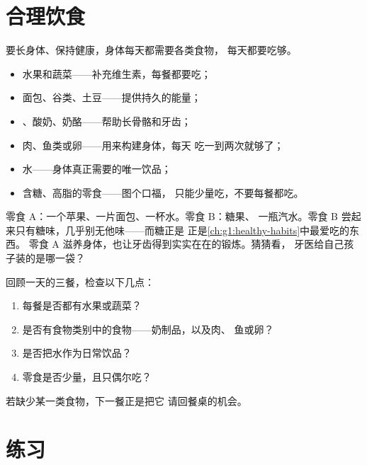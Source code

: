 \section{合理饮食}

\begin{proposition}[均衡的餐盘]\label{prop:g2:teeth-and-eating-well:balanced}
要长身体、保持健康，身体每天都需要各类食物，
每天都要吃够。
\begin{itemize}
  \item 水果和蔬菜——补充维生素，每餐都要吃；
  \item 面包、谷类、土豆——提供持久的能量；
  \item {}、酸奶、奶酪——帮助长骨骼和牙齿；
  \item 肉、鱼类或卵——用来构建身体，每天
        吃一到两次就够了；
  \item 水——身体真正需要的唯一饮品；
  \item 含糖、高脂的零食——图个口福，
        只能少量吃，不要每餐都吃。
\end{itemize}
\end{proposition}
\admitted

\begin{example}[两袋零食]\label{ex:g2:teeth-and-eating-well:snack}
零食 A：一个苹果、一片面包、一杯水。零食 B：糖果、
一瓶汽水。零食 B 尝起来只有糖味，几乎别无他味——而糖正是
正是\cref{ch:g1:healthy-habits}中最爱吃的东西。
零食 A 滋养身体，也让牙齿得到实实在在的锻炼。猜猜看，
牙医给自己孩子装的是哪一袋？
\end{example}

\begin{method}[检查一天的菜单]\label{met:g2:teeth-and-eating-well:check}
回顾一天的三餐，检查以下几点：
\begin{enumerate}
  \item 每餐是否都有水果或蔬菜？
  \item 是否有食物类别中的食物——奶制品，以及肉、
        鱼或卵？
  \item 是否把水作为日常饮品？
  \item 零食是否少量，且只偶尔吃？
\end{enumerate}
若缺少某一类食物，下一餐正是把它
请回餐桌的机会。
\end{method}

\section{练习}

